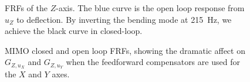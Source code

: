\documentclass[twocolumn,oneside]{IEEEtran/IEEEtran}
\begin{document}





\begin{figure}[t!]
  \centering
  
  \caption{FRFs of the $Z$-axis. The blue curve is the open loop response from $u_Z$ to deflection. By inverting the bending mode at 215~Hz, we achieve the black curve in closed-loop.}
  \label{fig:z_control}
\end{figure}


\begin{figure}
  \centering
  
  \caption{MIMO closed and open loop FRFs, showing the dramatic affect on $G_{Z,u_X}$ and $G_{Z,u_Y}$ when the feedforward compensators are used for the $X$ and $Y$ axes.}
  \label{fig:mimo_frf_uxuy}
\end{figure}
\end{document}
